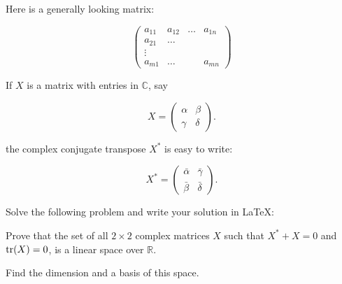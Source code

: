 \documentclass[11pt]{amsart}
\newcommand{\R}{\mathbb R}
\newcommand{\C}{\mathbb C}
\begin{document}
Here is a generally looking matrix: 

$$ \left( \begin{array}{cccc} 
            a_{11} & a_{12} & \ldots & a_{1n} \\
            a_{21} & \ldots &        &        \\
            \vdots &        &        &        \\
            a_{m1} & \ldots &        & a_{mn}   
                \end{array} \right) $$    

If $X$ is a matrix with entries in $\C$, say  

\begin{equation}  
     X = \left( \begin{array}{cc} 
                   \alpha &   \beta \\
                    \gamma &  \delta    \end{array} \right). 
\end{equation} 

the complex conjugate transpose $X^*$ is easy to write: 

\begin{equation}  
     X^* = \left( \begin{array}{cc} 
                   \bar{\alpha} &   \bar{\gamma} \\
                    \bar{\beta} &  \bar{\delta}    \end{array} \right). 
\end{equation} 


Solve the following problem and write your solution in \LaTeX :

Prove that the set of all $2 \times 2$ 
complex matrices $X$ such that $X^* +X =0$ and ${\rm tr}(X)=0$, is a linear 
space over $\R$.   

Find the dimension and a basis of this space. 
\end{document}
